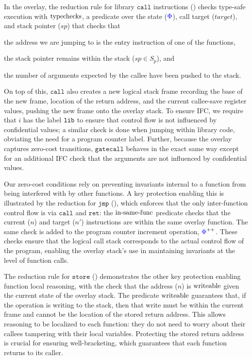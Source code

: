 %
In the overlay, the reduction rule for library $\mathtt{call}$ instructions
(\explainredOcall{}) checks type-safe execution with $\operatorname{typechecks}$, a
predicate over the state (${\color{blue}{\Phi}}$), call target ($\mathit{target}$), and
stack pointer ($sp$) that checks that
\begin{enumerate*}
\item the address we are jumping to is the entry instruction of one of the
functions,

\item the stack pointer remains within the stack ($sp \in S_p$), and

\item the number of arguments expected by the callee have been pushed
to the stack.
\end{enumerate*}
%
On top of this, $\mathtt{call}$ also creates a new logical stack frame
recording the base of the new frame, location of the return address, and the
current callee-save register values, pushing the new frame onto the overlay
stack.
%
To ensure IFC, we require that $i$ has the label $\mathtt{lib}$ to ensure that
control flow is not influenced by confidential values; a similar check is done
when jumping within library code, obviating the need for a program counter
label.
%
Further, because the overlay captures zero-cost transitions, $\mathtt{gatecall}$
behaves in the exact same way except for an additional IFC check that the
arguments are not influenced by confidential values.

%
Our zero-cost conditions rely on preventing invariants internal to a function
from being interfered with by other functions.
%
A key protection enabling this is illustrated by the reduction
for $\mathtt{jmp}$ (\explainredOjmp), which enforces that the
only inter-function control flow is via $\mathtt{call}$
and $\mathtt{ret}$: the $\operatorname{in-same-func}$ predicate
checks that the current ($n$) and target ($n'$)
instructions are within the same overlay function.
%
The same check is added to the program counter increment operation,
${{\color{blue}{\Phi}}}^{++}$.
%
These checks ensure that the logical call stack corresponds to the actual
control flow of the program, enabling the overlay stack's use in maintaining
invariants at the level of function calls.

%
The reduction rule for $\mathtt{store}$ (\explainredOstore) demonstrates the
other key protection enabling function local reasoning, with the check that the
address ($n$) is $\operatorname{writeable}$ given the current state of the overlay stack.
%
The predicate $\operatorname{writeable}$ guarantees that, if the operation is writing
to the stack, then that write must be within the current frame and cannot be the
location of the stored return address.
%
This allows reasoning to be localized to each function: they do not need to
worry about their callees tampering with their local variables.
%
Protecting the stored return address is crucial for ensuring well-bracketing,
which guarantees that each function returns to its caller.

